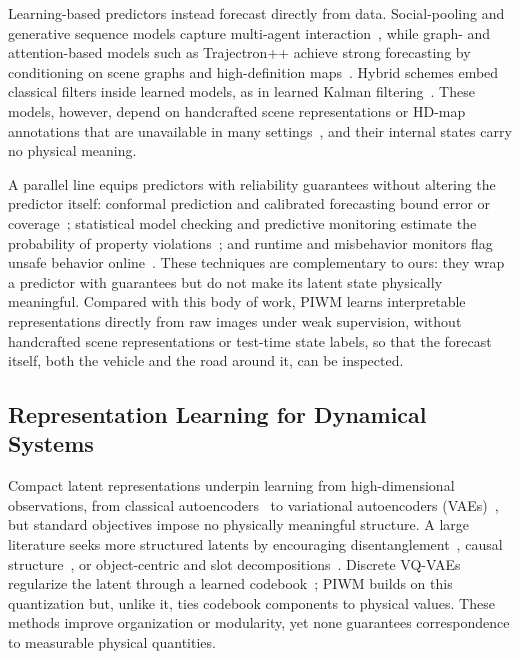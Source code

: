 \documentclass[preprint,12pt]{elsarticle}
\begin{document}
Learning-based predictors instead forecast directly from data.
Social-pooling and generative sequence models capture multi-agent
interaction~\cite{alahi2016social, gupta2018social, wen2022social}, while graph-
and attention-based models such as Trajectron++ achieve strong forecasting by
conditioning on scene graphs and high-definition maps~\cite{salzmann2020trajectron++}.
Hybrid schemes embed classical filters inside learned models, as in learned
Kalman filtering~\cite{revach2022kalmannet}.
These models, however, depend on handcrafted scene representations or HD-map
annotations that are unavailable in many settings~\cite{itkina2023interpretable,
hsu2023interpretable}, and their internal states carry no physical meaning.

A parallel line equips predictors with reliability guarantees without altering
the predictor itself: conformal prediction and calibrated forecasting bound error
or coverage~\cite{lindemann2023conformal, lu2024towards, ruchkin2022confidence,
cleaveland2022risk}; statistical model checking and predictive monitoring estimate
the probability of property violations~\cite{qin2022statistical, zarei2020statistical,
cairoli2021neural, waga2022dynamic}; and runtime and misbehavior monitors flag
unsafe behavior online~\cite{stocco2020misbehaviour, ma2020stlnet, mao2024safe,
mao2025safe}.
These techniques are complementary to ours: they wrap a predictor with guarantees
but do not make its latent state physically meaningful.
Compared with this body of work, PIWM learns interpretable representations
directly from raw images under weak supervision, without handcrafted scene
representations or test-time state labels, so that the forecast itself, both the
vehicle and the road around it, can be inspected.

\subsection{Representation Learning for Dynamical Systems}\label{sec:rw_repr}

Compact latent representations underpin learning from high-dimensional
observations, from classical autoencoders~\cite{Hinton06} to variational
autoencoders (VAEs)~\cite{kingma2013auto}, but standard objectives impose no
physically meaningful structure.
A large literature seeks more structured latents by encouraging
disentanglement~\cite{higgins2017beta, kim2018disentangling, chen2018isolating},
causal structure~\cite{yang2021causalvae, scholkopf2021toward}, or object-centric
and slot decompositions~\cite{mosbach2025soldslotobjectcentriclatent}.
Discrete VQ-VAEs regularize the latent through a learned
codebook~\cite{van2017neural, razavi2019generating}; PIWM builds on this
quantization but, unlike it, ties codebook components to physical values.
These methods improve organization or modularity, yet none guarantees
correspondence to measurable physical quantities.
\end{document}
